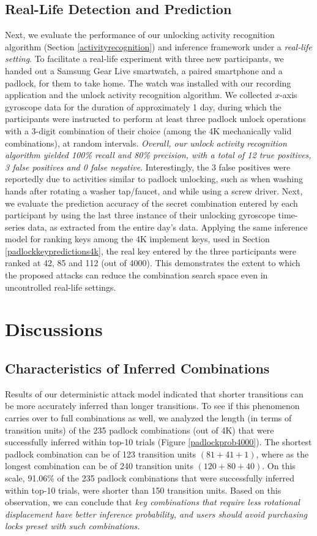 \documentclass[]{IEEEtran}
\begin{document}
\subsection{Real-Life Detection and Prediction}
\label{eval:uncontrolled}
Next, we evaluate the performance of our unlocking activity recognition algorithm (Section \ref{activityrecognition}) and inference framework under a \emph{real-life setting}. To facilitate a real-life experiment with three new participants, we handed out a Samsung Gear Live smartwatch, a paired smartphone and a padlock, for them to take home. The watch was installed with our recording application and the unlock activity recognition algorithm. We collected $x$-axis gyroscope data for the duration of approximately 1 day, during which the participants were instructed to perform at least three padlock unlock operations with a 3-digit combination of their choice (among the 4K mechanically valid combinations), at random intervals. \emph{Overall, our unlock activity recognition algorithm yielded 100\% recall and 80\% precision, with a total of 12 true positives, 3 false positives and 0 false negative}. Interestingly, the 3 false positives were reportedly due to activities similar to padlock unlocking, such as when washing hands after rotating a washer tap/faucet, and while using a screw driver. Next, we evaluate the prediction accuracy of the secret combination entered by each participant by using the last three instance of their unlocking gyroscope time-series data, as extracted from the entire day's data. Applying the same inference model for ranking keys among the 4K implement keys, used in Section \ref{padlockkeypredictions4k}, the real key entered by the three participants were ranked at 42, 85 and 112 (out of 4000). This demonstrates the extent to which the proposed attacks can reduce the combination search space even in uncontrolled real-life settings.

\section{Discussions}
\label{discussions}
\subsection{Characteristics of Inferred Combinations}
Results of our deterministic attack model indicated that shorter transitions can be more accurately inferred than longer transitions. To see if this phenomenon carries over to full combinations as well, we analyzed the length (in terms of transition units) of the 235 padlock combinations (out of 4K) that were successfully inferred within top-10 trials (Figure \ref{padlockprob4000}). The shortest padlock combination can be of 123 transition units $(81+41+1)$, where as the longest combination can be of 240 transition units $(120+80+40)$. On this scale, 91.06\% of the 235 padlock combinations that were successfully inferred within top-10 trials, were shorter than 150 transition units. Based on this observation, we can conclude that \emph{key combinations that require less rotational displacement have better inference probability, and users should avoid purchasing locks preset with such combinations.}
\end{document}
